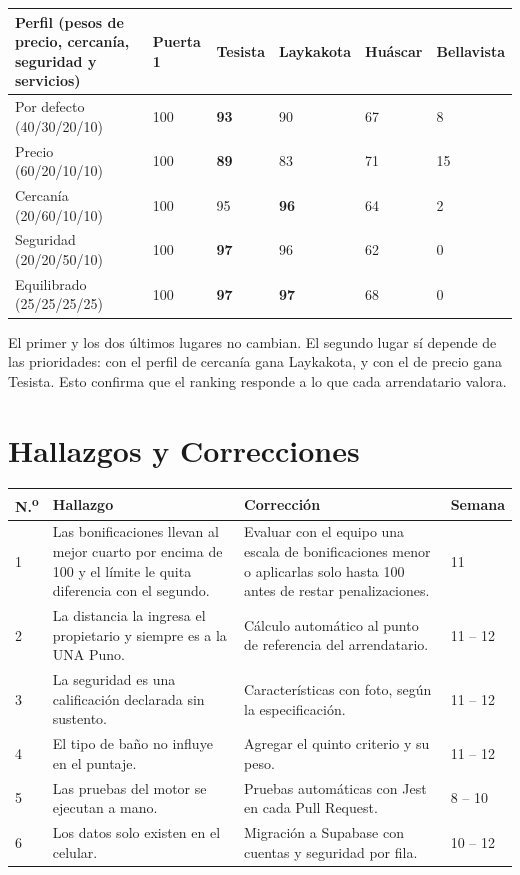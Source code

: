 \documentclass[11pt,a4paper]{article}
\begin{document}
\vspace{0.1cm}
{\footnotesize
{}
\noindent\begin{tabularx}{\textwidth}{@{}L C{1.5cm} C{1.5cm} C{1.6cm} C{1.5cm} C{1.6cm}@{}}
\toprule
{}
\textbf{Perfil (pesos de precio, cercanía, seguridad y servicios)} & \textbf{Puerta 1} & \textbf{Tesista} & \textbf{Laykakota} & \textbf{Huáscar} & \textbf{Bellavista} \\
\midrule
Por defecto (40/30/20/10) & 100 & \textbf{93} & 90 & 67 & 8 \\
Precio (60/20/10/10) & 100 & \textbf{89} & 83 & 71 & 15 \\
Cercanía (20/60/10/10) & 100 & 95 & \textbf{96} & 64 & 2 \\
Seguridad (20/20/50/10) & 100 & \textbf{97} & 96 & 62 & 0 \\
Equilibrado (25/25/25/25) & 100 & \textbf{97} & \textbf{97} & 68 & 0 \\
\bottomrule
\end{tabularx}
}

\vspace{0.15cm}
\noindent El primer y los dos últimos lugares no cambian. El segundo lugar sí depende de las prioridades: con el perfil de cercanía gana Laykakota, y con el de precio gana Tesista. Esto confirma que el ranking responde a lo que cada arrendatario valora.

\section{Hallazgos y Correcciones}
{\small
{}
\noindent\begin{tabularx}{\textwidth}{@{}C{0.7cm} L L C{1.5cm}@{}}
\toprule
{}
\textbf{N.\textsuperscript{o}} & \textbf{Hallazgo} & \textbf{Corrección} & \textbf{Semana} \\
 & Las bonificaciones llevan al mejor cuarto por encima de 100 y el límite le quita diferencia con el segundo. & Evaluar con el equipo una escala de bonificaciones menor o aplicarlas solo hasta 100 antes de restar penalizaciones. & 11 \\
2 & La distancia la ingresa el propietario y siempre es a la UNA Puno. & Cálculo automático al punto de referencia del arrendatario. & 11 -- 12 \\
3 & La seguridad es una calificación declarada sin sustento. & Características con foto, según la especificación. & 11 -- 12 \\
4 & El tipo de baño no influye en el puntaje. & Agregar el quinto criterio y su peso. & 11 -- 12 \\
5 & Las pruebas del motor se ejecutan a mano. & Pruebas automáticas con Jest en cada Pull Request. & 8 -- 10 \\
6 & Los datos solo existen en el celular. & Migración a Supabase con cuentas y seguridad por fila. & 10 -- 12 \\
\bottomrule
\end{tabularx}
}
\end{document}
